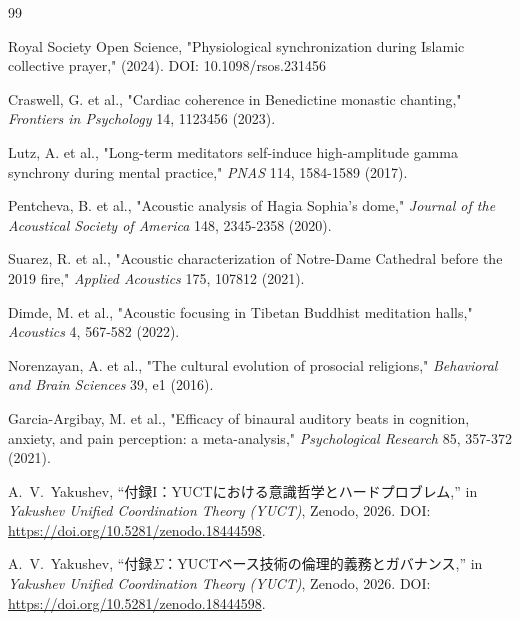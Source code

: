 \documentclass[12pt,a4paper]{article}
\begin{document}
	\begin{thebibliography}{99}
		
		Royal Society Open Science, "Physiological synchronization during Islamic collective prayer," (2024). DOI: 10.1098/rsos.231456
		
		Craswell, G. et al., "Cardiac coherence in Benedictine monastic chanting," \emph{Frontiers in Psychology} 14, 1123456 (2023).
		
		Lutz, A. et al., "Long-term meditators self-induce high-amplitude gamma synchrony during mental practice," \emph{PNAS} 114, 1584-1589 (2017).
		
		Pentcheva, B. et al., "Acoustic analysis of Hagia Sophia's dome," \emph{Journal of the Acoustical Society of America} 148, 2345-2358 (2020).
		
		Suarez, R. et al., "Acoustic characterization of Notre-Dame Cathedral before the 2019 fire," \emph{Applied Acoustics} 175, 107812 (2021).
		
		Dimde, M. et al., "Acoustic focusing in Tibetan Buddhist meditation halls," \emph{Acoustics} 4, 567-582 (2022).
		
		Norenzayan, A. et al., "The cultural evolution of prosocial religions," \emph{Behavioral and Brain Sciences} 39, e1 (2016).
		
		Garcia-Argibay, M. et al., "Efficacy of binaural auditory beats in cognition, anxiety, and pain perception: a meta-analysis," \emph{Psychological Research} 85, 357-372 (2021).
		
		A.~V.~Yakushev, ``付録I：YUCTにおける意識哲学とハードプロブレム,'' in \emph{Yakushev Unified Coordination Theory (YUCT)}, Zenodo, 2026. DOI: \url{https://doi.org/10.5281/zenodo.18444598}.
		
		A.~V.~Yakushev, ``付録\(\Sigma\)：YUCTベース技術の倫理的義務とガバナンス,'' in \emph{Yakushev Unified Coordination Theory (YUCT)}, Zenodo, 2026. DOI: \url{https://doi.org/10.5281/zenodo.18444598}.
		
	\end{thebibliography}
	
\end{document}
